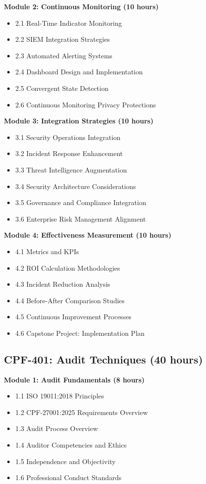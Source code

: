 \documentclass[11pt,a4paper]{article}
\begin{document}
\textbf{Module 2: Continuous Monitoring (10 hours)}
\begin{itemize}
\item 2.1 Real-Time Indicator Monitoring
\item 2.2 SIEM Integration Strategies
\item 2.3 Automated Alerting Systems
\item 2.4 Dashboard Design and Implementation
\item 2.5 Convergent State Detection
\item 2.6 Continuous Monitoring Privacy Protections
\end{itemize}

\textbf{Module 3: Integration Strategies (10 hours)}
\begin{itemize}
\item 3.1 Security Operations Integration
\item 3.2 Incident Response Enhancement
\item 3.3 Threat Intelligence Augmentation
\item 3.4 Security Architecture Considerations
\item 3.5 Governance and Compliance Integration
\item 3.6 Enterprise Risk Management Alignment
\end{itemize}

\textbf{Module 4: Effectiveness Measurement (10 hours)}
\begin{itemize}
\item 4.1 Metrics and KPIs
\item 4.2 ROI Calculation Methodologies
\item 4.3 Incident Reduction Analysis
\item 4.4 Before-After Comparison Studies
\item 4.5 Continuous Improvement Processes
\item 4.6 Capstone Project: Implementation Plan
\end{itemize}

\subsection{CPF-401: Audit Techniques (40 hours)}

\textbf{Module 1: Audit Fundamentals (8 hours)}
\begin{itemize}
\item 1.1 ISO 19011:2018 Principles
\item 1.2 CPF-27001:2025 Requirements Overview
\item 1.3 Audit Process Overview
\item 1.4 Auditor Competencies and Ethics
\item 1.5 Independence and Objectivity
\item 1.6 Professional Conduct Standards
\end{itemize}
\end{document}

